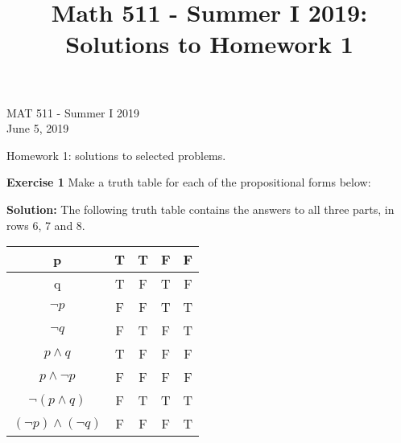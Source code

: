 \documentclass[12pt,oneside]{exam}
\title{Math 511 - Summer I 2019: Solutions to Homework 1}
\newenvironment{exercise}[1]{\vspace{.1in}\noindent\textbf{Exercise #1 \hspace{.05em}}}{}
\newenvironment{newsolution}{\vspace{.1in}\noindent\textbf{Solution: \hspace{.05em}}}{}
\begin{document}
\begin{flushright}
\sc MAT 511 - Summer I 2019\\
June 5, 2019
\end{flushright}
\bigskip
 
\begin{center}
\textsf{Homework 1: solutions to selected problems.} 
\end{center}


\begin{exercise}{1}
Make a truth table for each of the propositional forms below:
\end{exercise}

\begin{newsolution} 
The following truth table contains the answers to all three parts, in rows 6, 7 and 8.
\begin{center}
\begin{tabular}{|c|c|c|c|c|}
\hline 
p & T & T & F & F \\ 
\hline 
q & T & F & T & F \\ 
\hline 
$\neg p$  & F & F & T & T \\ 
\hline 
$\neg q$ & F & T & F & T \\ 
\hline 
$p \land q$ & T & F & F & F \\ 
\hline 
$p \land \neg p$ & F & F & F & F \\ 
\hline 
$\neg ( p \land q)$ & F & T & T & T \\ 
\hline 
$(\neg p) \land (\neg q)$ & F & F & F & T \\ 
\hline 
\end{tabular} 
\end{center}
\end{newsolution}
\end{document}
